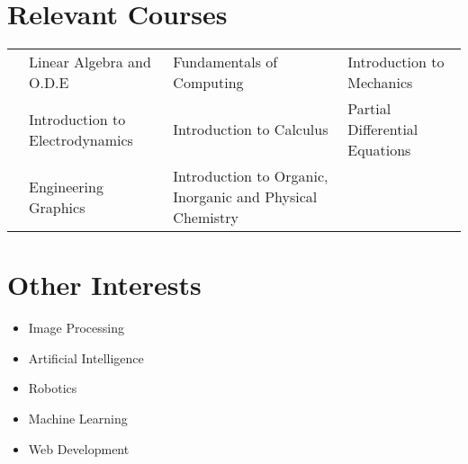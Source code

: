 \documentclass[11pt,a4paper]{moderncv}
\begin{document}
  \section{Relevant Courses}
    \begin{tabular}{L{0.05cm} L{6cm} L{5.5cm} L{5.5cm}}
      & Linear Algebra and O.D.E        & Fundamentals of Computing & Introduction to Mechanics\\
      & Introduction to Electrodynamics & Introduction to Calculus  & Partial Differential Equations\\
      & Engineering Graphics            & Introduction to Organic, Inorganic and Physical Chemistry
    \end{tabular}
  \section{Other Interests}
    \begin {itemize}
  \item Image Processing
      \item Artificial Intelligence
      \item Robotics
      \item Machine Learning
      \item Web Development
    \end{itemize}
\end{document}
